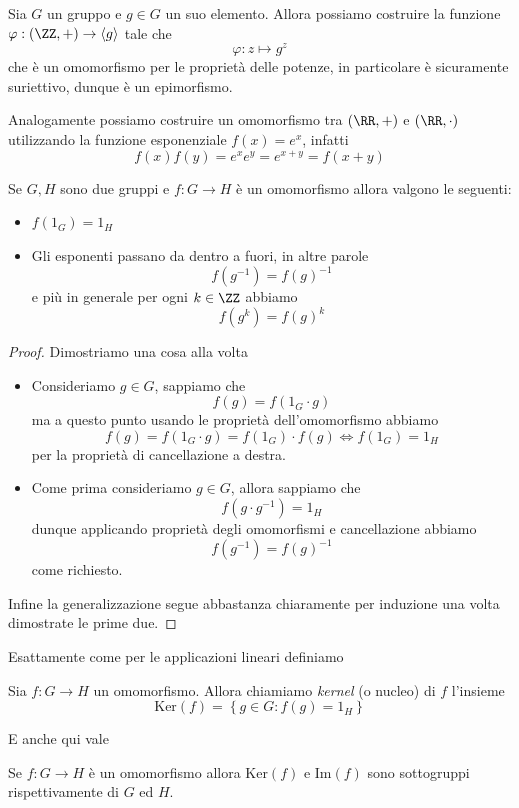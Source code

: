 \documentclass[11pt]{scrartcl}
\newcommand{\Immagine}[1]{\text{Im}\!\left(#1\right)}
\renewcommand{\ker}[1]{\text{Ker}\!\left(#1\right)}
\begin{document}
	\begin{example}\label{esempio di periodicità}
		Sia $G$ un gruppo e $g\in G$ un suo elemento. Allora possiamo costruire la funzione $\varphi:(\ZZ,+)\to \langle g \rangle$ tale che
		$$\varphi:z\mapsto g^z$$
		che è un omomorfismo per le proprietà delle potenze, in particolare è sicuramente suriettivo, dunque è un epimorfismo.
	\end{example}
	\begin{example}
		Analogamente possiamo costruire un omomorfismo tra $(\RR,+)$ e $(\RR,\cdot)$ utilizzando la funzione esponenziale $f(x)=e^x$, infatti
		$$f(x)f(y)=e^xe^y=e^{x+y}=f(x+y)$$
	\end{example}
	\begin{lemma}
		Se $G,H$ sono due gruppi e $f:G\to H$ è un omomorfismo allora valgono le seguenti:
		\begin{itemize}
			\item $f(1_G)=1_H$
			\item Gli esponenti passano da dentro a fuori, in altre parole 
			$$f(g^{-1})=f(g)^{-1}$$
			e più in generale per ogni $k\in\ZZ$ abbiamo
			$$f(g^k)=f(g)^k$$
		\end{itemize}
	\end{lemma}
	\begin{proof}
		Dimostriamo una cosa alla volta
		\begin{itemize}
			\item Consideriamo $g\in G$, sappiamo che
			$$f(g)=f(1_G\cdot g)$$
			ma a questo punto usando le proprietà dell'omomorfismo abbiamo
			$$f(g)=f(1_G\cdot g)=f(1_G)\cdot f(g)\iff f(1_G)=1_H$$
			per la proprietà di cancellazione a destra.
			\item Come prima consideriamo $g\in G$, allora sappiamo che 
			$$f(g\cdot g^{-1})=1_H$$
			dunque applicando proprietà degli omomorfismi e cancellazione abbiamo
			$$f(g^{-1})=f(g)^{-1}$$
			come richiesto.
		\end{itemize}
		Infine la generalizzazione segue abbastanza chiaramente per induzione una volta dimostrate le prime due. 
	\end{proof}
	Esattamente come per le applicazioni lineari definiamo 
	\begin{definition}[Kernel]
		Sia $f:G\to H$ un omomorfismo. Allora chiamiamo \textit{kernel} (o nucleo) di $f$ l'insieme
		$$\ker{f}=\left\{g\in G: f(g)=1_H\right\}$$
	\end{definition}
	E anche qui vale
	\begin{lemma}
		Se $f:G\to H$ è un omomorfismo allora $\ker{f}$ e $\Immagine{f}$ sono sottogruppi rispettivamente di $G$ ed $H$.
	\end{lemma}
\end{document}
